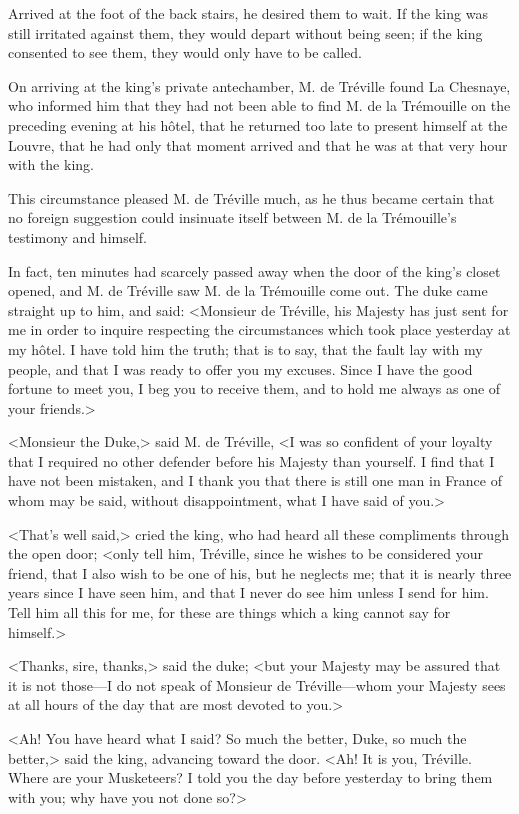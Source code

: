 Arrived at the foot of the back stairs, he desired them to wait. If the king was still irritated against them, they would depart without being seen; if the king consented to see them, they would only have to be called. 

On arriving at the king's private antechamber, M. de Tréville found La Chesnaye, who informed him that they had not been able to find M. de la Trémouille on the preceding evening at his hôtel, that he returned too late to present himself at the Louvre, that he had only that moment arrived and that he was at that very hour with the king. 

This circumstance pleased M. de Tréville much, as he thus became certain that no foreign suggestion could insinuate itself between M. de la Trémouille's testimony and himself. 

In fact, ten minutes had scarcely passed away when the door of the king's closet opened, and M. de Tréville saw M. de la Trémouille come out. The duke came straight up to him, and said: <Monsieur de Tréville, his Majesty has just sent for me in order to inquire respecting the circumstances which took place yesterday at my hôtel. I have told him the truth; that is to say, that the fault lay with my people, and that I was ready to offer you my excuses. Since I have the good fortune to meet you, I beg you to receive them, and to hold me always as one of your friends.> 

<Monsieur the Duke,> said M. de Tréville, <I was so confident of your loyalty that I required no other defender before his Majesty than yourself. I find that I have not been mistaken, and I thank you that there is still one man in France of whom may be said, without disappointment, what I have said of you.> 

<That's well said,> cried the king, who had heard all these compliments through the open door; <only tell him, Tréville, since he wishes to be considered your friend, that I also wish to be one of his, but he neglects me; that it is nearly three years since I have seen him, and that I never do see him unless I send for him. Tell him all this for me, for these are things which a king cannot say for himself.> 

<Thanks, sire, thanks,> said the duke; <but your Majesty may be assured that it is not those---I do not speak of Monsieur de Tréville---whom your Majesty sees at all hours of the day that are most devoted to you.> 

<Ah! You have heard what I said? So much the better, Duke, so much the better,> said the king, advancing toward the door. <Ah! It is you, Tréville. Where are your Musketeers? I told you the day before yesterday to bring them with you; why have you not done so?> 


